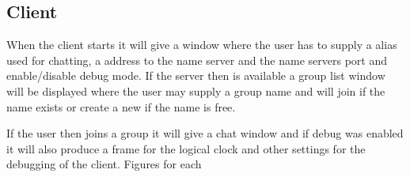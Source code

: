 \subsection{Client}
When the client starts it will give a window where the user has to supply a alias used for chatting, a address to the name server and the name servers port and enable/disable debug mode.
If the server then is available a group list window will be displayed where the user may supply a group name and will join if the name exists or create a new if the name is free. 

If the user then joins a group it will give a chat window and if debug was enabled it will also produce a frame for the logical clock and other settings for the debugging of the client. Figures for each %








